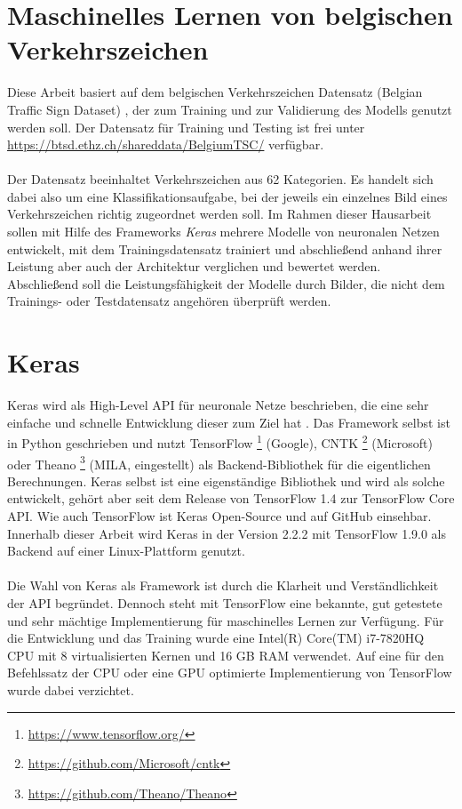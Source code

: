 



\section{Maschinelles Lernen von belgischen Verkehrszeichen}
Diese Arbeit basiert auf dem belgischen Verkehrszeichen Datensatz (Belgian Traffic Sign Dataset) \cite{Timofte-MVA-2011}, der zum Training und zur Validierung des Modells genutzt werden soll. 
Der Datensatz für Training und Testing ist frei unter \url{https://btsd.ethz.ch/shareddata/BelgiumTSC/} verfügbar. \\
\\
Der Datensatz beeinhaltet Verkehrszeichen aus 62 Kategorien. Es handelt sich dabei also um eine Klassifikationsaufgabe, bei der jeweils ein einzelnes Bild eines Verkehrszeichen richtig zugeordnet werden soll. 
Im Rahmen dieser Hausarbeit sollen mit Hilfe des Frameworks \textit{Keras} mehrere Modelle von neuronalen Netzen entwickelt, mit dem Trainingsdatensatz trainiert und abschließend anhand ihrer Leistung aber auch der Architektur verglichen und bewertet werden. Abschließend soll die Leistungsfähigkeit der Modelle durch Bilder, die nicht dem Trainings- oder Testdatensatz angehören überprüft werden.

\section{Keras}
Keras wird als High-Level API für neuronale Netze beschrieben, die eine sehr einfache und schnelle Entwicklung dieser zum Ziel hat \cite{keras}. Das Framework selbst ist in Python geschrieben und nutzt TensorFlow \footnote{\url{https://www.tensorflow.org/}} (Google), CNTK \footnote{\url{https://github.com/Microsoft/cntk}} (Microsoft) oder Theano \footnote{\url{https://github.com/Theano/Theano}} (MILA, eingestellt) als Backend-Bibliothek für die eigentlichen Berechnungen. Keras selbst ist eine eigenständige Bibliothek und wird als solche entwickelt, gehört aber seit dem Release von TensorFlow 1.4 zur TensorFlow Core API. 
Wie auch TensorFlow ist Keras Open-Source und auf GitHub einsehbar.
Innerhalb dieser Arbeit wird Keras in der Version 2.2.2 mit TensorFlow 1.9.0 als Backend auf einer Linux-Plattform genutzt. \\
\\
Die Wahl von Keras als Framework ist durch die Klarheit und Verständlichkeit der API begründet. Dennoch steht mit TensorFlow eine bekannte, gut getestete und sehr mächtige Implementierung für maschinelles Lernen zur Verfügung. 
Für die Entwicklung und das Training wurde eine Intel(R) Core(TM) i7-7820HQ CPU mit 8 virtualisierten Kernen und 16 GB RAM verwendet. Auf eine für den Befehlssatz der CPU oder eine GPU optimierte Implementierung von TensorFlow wurde dabei verzichtet.


